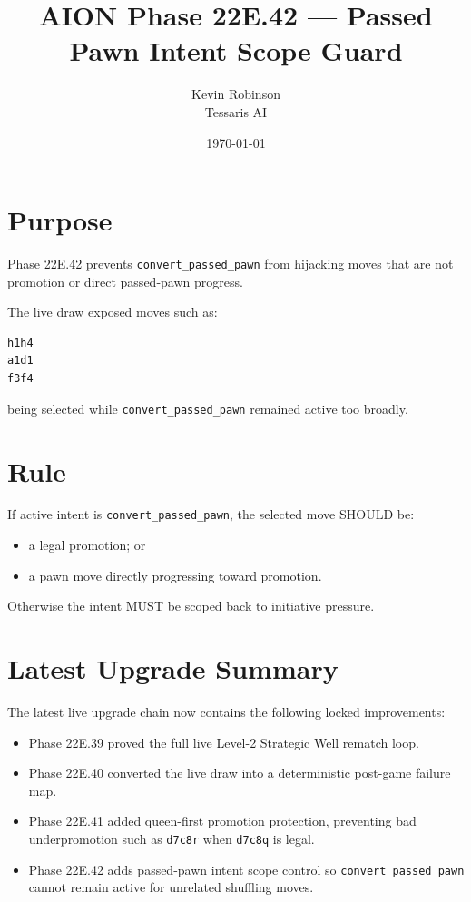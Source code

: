 \documentclass[11pt,a4paper]{article}
\title{\textbf{AION Phase 22E.42 --- Passed Pawn Intent Scope Guard}}
\author{Kevin Robinson\\Tessaris AI}
\date{\today}
\begin{document}
\maketitle

\section{Purpose}

Phase 22E.42 prevents \texttt{convert\_passed\_pawn} from hijacking moves that are not promotion or direct passed-pawn progress.

The live draw exposed moves such as:

\begin{verbatim}
h1h4
a1d1
f3f4
\end{verbatim}

being selected while \texttt{convert\_passed\_pawn} remained active too broadly.

\section{Rule}

If active intent is \texttt{convert\_passed\_pawn}, the selected move SHOULD be:

\begin{itemize}
  \item a legal promotion; or
  \item a pawn move directly progressing toward promotion.
\end{itemize}

Otherwise the intent MUST be scoped back to initiative pressure.


\section{Latest Upgrade Summary}

The latest live upgrade chain now contains the following locked improvements:

\begin{itemize}
  \item Phase 22E.39 proved the full live Level-2 Strategic Well rematch loop.
  \item Phase 22E.40 converted the live draw into a deterministic post-game failure map.
  \item Phase 22E.41 added queen-first promotion protection, preventing bad underpromotion such as \texttt{d7c8r} when \texttt{d7c8q} is legal.
  \item Phase 22E.42 adds passed-pawn intent scope control so \texttt{convert\_passed\_pawn} cannot remain active for unrelated shuffling moves.
\end{itemize}
\end{document}
